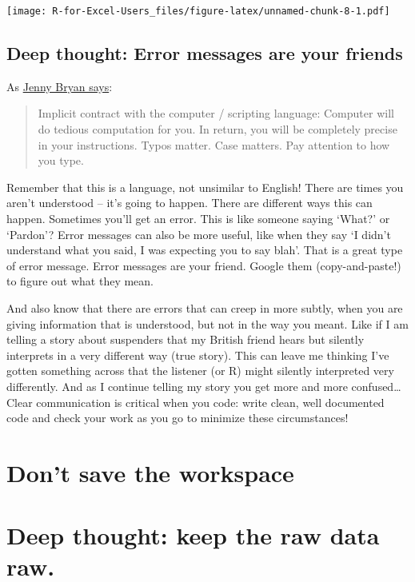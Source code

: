 \documentclass[]{book}
\begin{document}
\texttt{[image: R-for-Excel-Users\_files/figure-latex/unnamed-chunk-8-1.pdf]}

\hypertarget{deep-thought-error-messages-are-your-friends}{%
\subsection{Deep thought: Error messages are your friends}\label{deep-thought-error-messages-are-your-friends}}

As \href{https://stat545.com/r-basics.html}{Jenny Bryan says}:

\begin{quote}
Implicit contract with the computer / scripting language: Computer will do tedious computation for you. In return, you will be completely precise in your instructions. Typos matter. Case matters. Pay attention to how you type.
\end{quote}

Remember that this is a language, not unsimilar to English! There are times you aren't understood -- it's going to happen. There are different ways this can happen. Sometimes you'll get an error. This is like someone saying `What?' or `Pardon'? Error messages can also be more useful, like when they say `I didn't understand what you said, I was expecting you to say blah'. That is a great type of error message. Error messages are your friend. Google them (copy-and-paste!) to figure out what they mean.

And also know that there are errors that can creep in more subtly, when you are giving information that is understood, but not in the way you meant. Like if I am telling a story about suspenders that my British friend hears but silently interprets in a very different way (true story). This can leave me thinking I've gotten something across that the listener (or R) might silently interpreted very differently. And as I continue telling my story you get more and more confused\ldots{} Clear communication is critical when you code: write clean, well documented code and check your work as you go to minimize these circumstances!

\hypertarget{dont-save-the-workspace}{%
\section{Don't save the workspace}\label{dont-save-the-workspace}}

\hypertarget{deep-thought-keep-the-raw-data-raw.}{%
\section{Deep thought: keep the raw data raw.}\label{deep-thought-keep-the-raw-data-raw.}}
\end{document}
